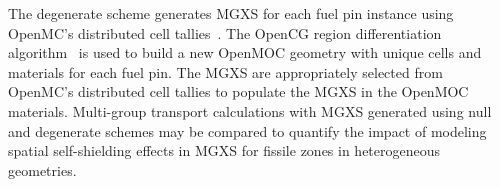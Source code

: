 The degenerate scheme generates MGXS for each fuel pin instance using OpenMC's distributed cell tallies~\citep{lax2014distribcell}. The OpenCG region differentiation algorithm~\citep{boyd2015opencg} is used to build a new OpenMOC geometry with unique cells and materials for each fuel pin. The MGXS are appropriately selected from OpenMC's distributed cell tallies to populate the MGXS in the OpenMOC materials. Multi-group transport calculations with MGXS generated using null and degenerate schemes may be compared to quantify the impact of modeling spatial self-shielding effects in MGXS for fissile zones in heterogeneous geometries.
